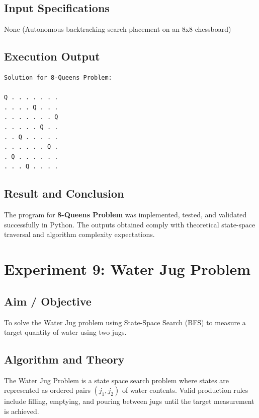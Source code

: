 \documentclass[11pt,a4paper]{report}
\begin{document}
\section{Input Specifications}
None (Autonomous backtracking search placement on an 8x8 chessboard)

\section{Execution Output}
\begin{tcolorbox}[colback=outputback,colframe=outputframe,title={\textbf{Terminal Output - 8-Queens Problem}}]
\begin{verbatim}
Solution for 8-Queens Problem:

Q . . . . . . .
. . . . Q . . .
. . . . . . . Q
. . . . . Q . .
. . Q . . . . .
. . . . . . Q .
. Q . . . . . .
. . . Q . . . .
\end{verbatim}
\end{tcolorbox}

\section{Result and Conclusion}
The program for \textbf{8-Queens Problem} was implemented, tested, and validated successfully in Python. The outputs obtained comply with theoretical state-space traversal and algorithm complexity expectations.

\newpage

\chapter{Experiment 9: Water Jug Problem}

\section{Aim / Objective}
To solve the Water Jug problem using State-Space Search (BFS) to measure a target quantity of water using two jugs.

\section{Algorithm and Theory}
The Water Jug Problem is a state space search problem where states are represented as ordered pairs $(j_1, j_2)$ of water contents. Valid production rules include filling, emptying, and pouring between jugs until the target measurement is achieved.
\end{document}
